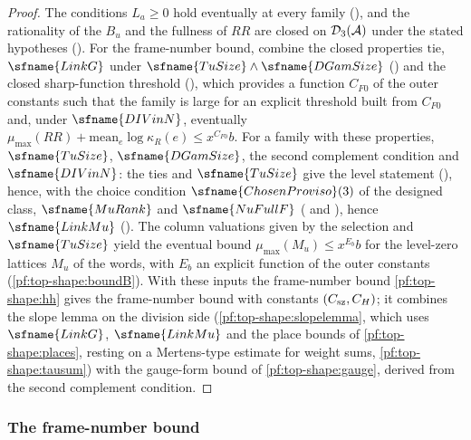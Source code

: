 \begin{proof}
The conditions $L_a\ge0$ hold eventually at every family (), and the
rationality of the $B_u$ and the fullness of $\mathit{RR}$ are closed on $\mathcal{D}_3(\mathcal A)$ under the stated
hypotheses (). For the frame-number bound, combine the closed properties $\mathrm{tie}$, $\sfname{LinkG}$ under
$\sfname{TuSize}\wedge\sfname{DGamSize}$ () and the
closed sharp-function threshold (), which provides a
function $C_{F0}$ of the outer constants such that the family is large for an explicit threshold built from $C_{F0}$
and, under $\sfname{DIVinN}$, eventually $\mu_{\max}(\mathit{RR})+\mathrm{mean}_e\log\kappa_R(e)\le x^{C_{F0}}b$. For a
family with these properties, $\sfname{TuSize}$, $\sfname{DGamSize}$, the second complement condition and
$\sfname{DIVinN}$: the ties and $\sfname{TuSize}$ give the level statement
(), hence, with the choice condition $\sfname{ChosenProviso}(3)$ of
the designed class, $\sfname{MuRank}$ and $\sfname{NuFullF}$
( and ), hence
$\sfname{LinkMu}$ (). The column valuations given by the selection and
$\sfname{TuSize}$ yield the eventual bound $\mu_{\max}(M_u)\le x^{E_b}b$ for the level-zero lattices $M_u$ of the
words, with $E_b$ an explicit function of the outer constants (\cref{pf:top-shape:boundB}). With these inputs the frame-number bound
\cref{pf:top-shape:hh} gives the frame-number bound with constants $(C_{\rm sz},C_H)$; it combines the slope lemma on
the division side (\cref{pf:top-shape:slopelemma}, which uses $\sfname{LinkG}$, $\sfname{LinkMu}$ and the place
bounds of \cref{pf:top-shape:places}, resting on a Mertens-type estimate for weight sums,
\cref{pf:top-shape:tausum}) with the gauge-form bound of \cref{pf:top-shape:gauge}, derived from the second
complement condition.
\end{proof}

\subsubsection*{The frame-number bound}

